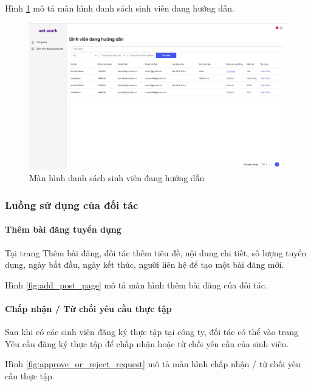\documentclass[./../main.tex]{subfiles}
\begin{document}
Hình \ref{fig:working_student_page} mô tả màn hình danh sách sinh viên đang hướng dẫn.

\begin{figure}[]
	\includegraphics[width=\linewidth]{./images/image8.png}
	\caption{Màn hình danh sách sinh viên đang hướng dẫn}
	\label{fig:working_student_page}
\end{figure}

\subsubsection{Luồng sử dụng của đối tác}

\paragraph*{Thêm bài đăng tuyển dụng}

Tại trang Thêm bài đăng, đối tác thêm tiêu đề, nội dung chi tiết, số lượng tuyển dụng, ngày bắt đầu, ngày kết thúc, người liên hệ để tạo một bài đăng mới.

Hình \ref{fig:add_post_page} mô tả màn hình thêm bài đăng của đối tác.

\paragraph*{Chấp nhận / Từ chối yêu cầu thực tập}

Sau khi có các sinh viên đăng ký thực tập tại công ty, đối tác có thể vào trang Yêu cầu đăng ký thực tập để chấp nhận hoặc từ chối yêu cầu của sinh viên.

Hình \ref{fig:approve_or_reject_request} mô tả màn hình chấp nhận / từ chối yêu cầu thực tập.
\end{document}
